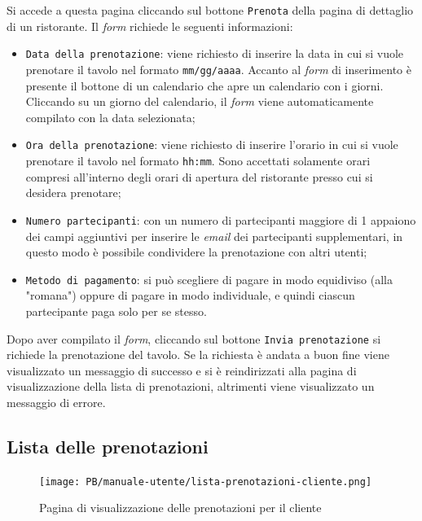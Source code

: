 Si accede a questa pagina cliccando sul bottone \texttt{Prenota} della pagina di
dettaglio di un ristorante. Il \textit{form} richiede le seguenti informazioni:
\begin{itemize}
	\item \texttt{Data della prenotazione}: viene richiesto di inserire la data in cui si
		vuole prenotare il tavolo nel formato \texttt{mm/gg/aaaa}. Accanto al
		\textit{form} di inserimento è presente il bottone di un calendario che apre un
		calendario con i giorni. Cliccando su un giorno del calendario, il \textit{form}
		viene automaticamente compilato con la data selezionata;

	\item \texttt{Ora della prenotazione}: viene richiesto di inserire l'orario in cui si
		vuole prenotare il tavolo nel formato \texttt{hh:mm}. Sono accettati
		solamente orari compresi all'interno degli orari di apertura del
		ristorante presso cui si desidera prenotare;

	\item \texttt{Numero partecipanti}: con un numero di partecipanti maggiore di 1
		appaiono dei campi aggiuntivi per inserire le \textit{email} dei partecipanti
		supplementari, in questo modo è possibile condividere la prenotazione
		con altri utenti;

	\item \texttt{Metodo di pagamento}: si può scegliere di pagare in modo equidiviso
		(alla "romana") oppure di pagare in modo individuale, e quindi ciascun
		partecipante paga solo per se stesso.
\end{itemize}

Dopo aver compilato il \textit{form}, cliccando sul bottone \texttt{Invia prenotazione} 
si richiede la prenotazione del tavolo. Se la richiesta è andata a buon fine
viene visualizzato un messaggio di successo e si è reindirizzati alla pagina di
visualizzazione della lista di prenotazioni, altrimenti viene visualizzato un
messaggio di errore.

\newpage
\subsection{Lista delle prenotazioni}
\begin{figure}[htbp]
    \centering
	\texttt{[image: PB/manuale-utente/lista-prenotazioni-cliente.png]}
    \caption{Pagina di visualizzazione delle prenotazioni per il cliente}
\end{figure}

